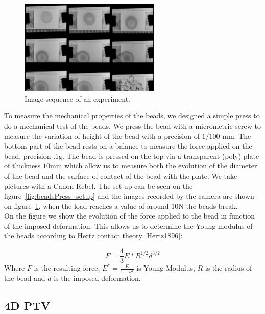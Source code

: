 \documentclass[lineno]{jfm}
\begin{document}
\begin{figure}
  \centerline{\includegraphics[width=0.6\textwidth]{figures/beadsProps_press01.png}}%
  \caption{Image sequence of an experiment.}
\label{fig:beadsPress_expe}
\end{figure}

To measure the mechanical properties of the beads, we designed a simple press to do a mechanical test of the beads. We press the bead with a micrometric screw to measure the variation of height of the bead with a precision of $1/100$ mm. The bottom part of the bead rests on a balance to measure the force applied on the bead, precision $.1$g. The bead is pressed on the top via a transparent (poly) plate of thickness $10$mm which allow us to measure both the evolution of the diameter of the bead and the surface of contact of the bead with the plate. We take pictures with a Canon Rebel. The set up can be seen on the figure~\ref{fig:beadsPress_setup} and the images recorded by the camera are shown on figure~\ref{fig:beadsPress_expe}, when the load reaches a value of around $10$N the beads break.\\


On the figure we show the evolution of the force applied to the bead in function of the imposed deformation. This allows us to determine the Young modulus of the beads according to Hertz contact theory \ref{Hertz1896}:

\begin{equation}
  F = \frac{4}{3} E* R^{1/2} d^{3/2}
  \label{Hertz1bead}
\end{equation}
Where $F$ is the resulting force, $E^* = \frac{E}{1-\nu^2}$ is Young Modulus, $R$ is the radius of the bead and $d$ is the imposed deformation.

\subsection{4D PTV}
\end{document}
